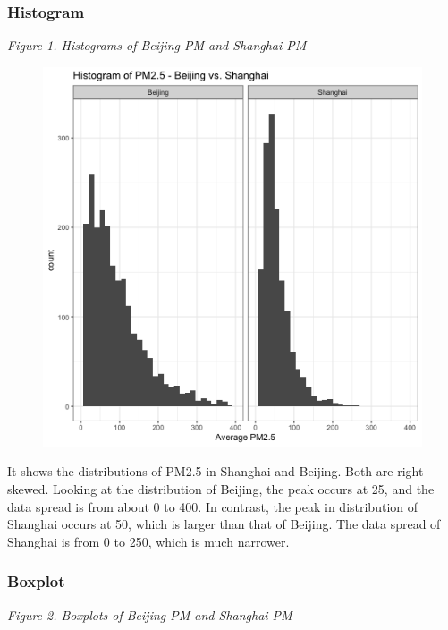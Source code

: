 \documentclass[]{article}
\begin{document}
\subsubsection{Histogram}\label{histogram}

\emph{Figure 1. Histograms of Beijing PM and Shanghai PM}

\begin{figure}
\centering
\includegraphics{../results/histogram.png}
\caption{}
\end{figure}

It shows the distributions of PM2.5 in Shanghai and Beijing. Both are
right-skewed. Looking at the distribution of Beijing, the peak occurs at
25, and the data spread is from about 0 to 400. In contrast, the peak in
distribution of Shanghai occurs at 50, which is larger than that of
Beijing. The data spread of Shanghai is from 0 to 250, which is much
narrower.

\subsubsection{Boxplot}\label{boxplot}

\emph{Figure 2. Boxplots of Beijing PM and Shanghai PM}
\end{document}
